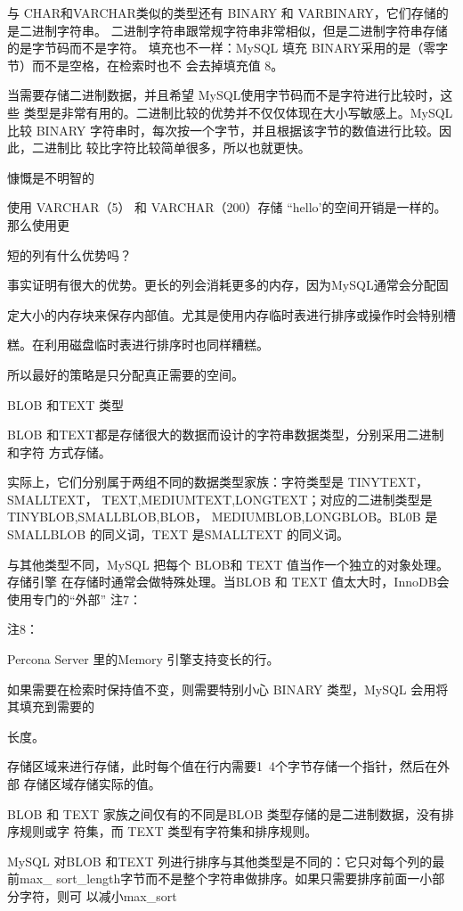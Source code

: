 与 CHAR和VARCHAR类似的类型还有 BINARY 和 VARBINARY，它们存储的是二进制字符串。
二进制字符串跟常规字符串非常相似，但是二进制字符串存储的是字节码而不是字符。
填充也不一样：MySQL 填充 BINARY采用的是\0（零字节）而不是空格，在检索时也不
会去掉填充值 8。

当需要存储二进制数据，并且希望 MySQL使用字节码而不是字符进行比较时，这些
类型是非常有用的。二进制比较的优势并不仅仅体现在大小写敏感上。MySQL 比较
BINARY 字符串时，每次按一个字节，并且根据该字节的数值进行比较。因此，二进制比
较比字符比较简单很多，所以也就更快。

慷慨是不明智的

使用 VARCHAR（5） 和 VARCHAR（200）存储 “hello’的空间开销是一样的。那么使用更

短的列有什么优势吗？

事实证明有很大的优势。更长的列会消耗更多的内存，因为MySQL通常会分配固

定大小的内存块来保存内部值。尤其是使用内存临时表进行排序或操作时会特别槽

糕。在利用磁盘临时表进行排序时也同样糟糕。

所以最好的策略是只分配真正需要的空间。

BLOB 和TEXT 类型

BLOB 和TEXT都是存储很大的数据而设计的字符串数据类型，分别采用二进制和字符
方式存储。

实际上，它们分别属于两组不同的数据类型家族：字符类型是 TINYTEXT，SMALLTEXT，
TEXT,MEDIUMTEXT,LONGTEXT；对应的二进制类型是 TINYBLOB,SMALLBLOB,BLOB，
MEDIUMBLOB,LONGBLOB。BL0B 是 SMALLBLOB 的同义词，TEXT 是SMALLTEXT 的同义词。

与其他类型不同，MySQL 把每个 BLOB和 TEXT 值当作一个独立的对象处理。存储引擎
在存储时通常会做特殊处理。当BLOB 和 TEXT 值太大时，InnoDB会使用专门的“外部”
注7：

注8：

Percona Server 里的Memory 引擎支持变长的行。

如果需要在检索时保持值不变，则需要特别小心 BINARY 类型，MySQL 会用\0将其填充到需要的

长度。

存储区域来进行存储，此时每个值在行内需要1~4个字节存储一个指针，然后在外部
存储区域存储实际的值。

BLOB 和 TEXT 家族之间仅有的不同是BLOB 类型存储的是二进制数据，没有排序规则或字
符集，而 TEXT 类型有字符集和排序规则。

MySQL 对BLOB 和TEXT 列进行排序与其他类型是不同的：它只对每个列的最前max\_
sort\_length字节而不是整个字符串做排序。如果只需要排序前面一小部分字符，则可
以减小max\_sort

